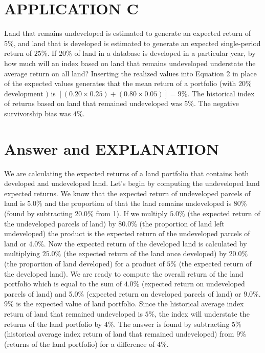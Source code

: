\documentclass[11pt]{article}
\begin{document}
\section*{APPLICATION C}
Land that remains undeveloped is estimated to generate an expected return of 5\%, and land that is developed is estimated to generate an expected single-period return of $25 \%$. If $20 \%$ of land in a database is developed in a particular year, by how much will an index based on land that remains undeveloped understate the average return on all land? Inserting the realized values into Equation 2 in place of the expected values generates that the mean return of a portfolio (with $20 \%$ development $)$ is $[(0.20 \times 0.25)+(0.80 \times 0.05)]=9 \%$. The historical index of returns based on land that remained undeveloped was $5 \%$. The negative survivorship bias was $4 \%$.

\section*{Answer and EXPLANATION}
We are calculating the expected returns of a land portfolio that contains both developed and undeveloped land. Let's begin by computing the undeveloped land expected returns. We know that the expected return of undeveloped parcels of land is $5.0 \%$ and the proportion of that the land remains undeveloped is $80 \%$ (found by subtracting $20.0 \%$ from 1). If we multiply $5.0 \%$ (the expected return of the undeveloped parcels of land) by $80.0 \%$ (the proportion of land left undeveloped) the product is the expected return of the undeveloped parcels of land or $4.0 \%$. Now the expected return of the developed land is calculated by multiplying $25.0 \%$ (the expected return of the land once developed) by $20.0 \%$ (the proportion of land developed) for a product of $5 \%$ (the expected return of the developed land). We are ready to compute the overall return of the land portfolio which is equal to the sum of $4.0 \%$ (expected return on undeveloped parcels of land) and 5.0\% (expected return on developed parcels of land) or $9.0 \%$. $9 \%$ is the expected value of land portfolio. Since the historical average index return of land that remained undeveloped is $5 \%$, the index will understate the returns of the land portfolio by $4 \%$. The answer is found by subtracting $5 \%$ (historical average index return of land that remained undeveloped) from $9 \%$ (returns of the land portfolio) for a difference of $4 \%$.
\end{document}
